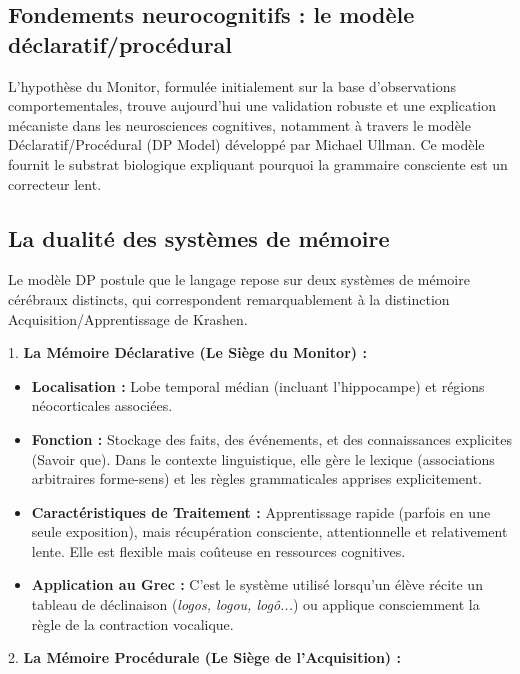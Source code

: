 \subsection{Fondements neurocognitifs : le modèle déclaratif/procédural}

L'hypothèse du Monitor, formulée initialement sur la base d'observations comportementales, trouve
aujourd'hui une validation robuste et une explication mécaniste dans les neurosciences cognitives,
notamment à travers le modèle Déclaratif/Procédural (DP Model) développé par Michael Ullman. Ce
modèle fournit le substrat biologique expliquant pourquoi la grammaire consciente est un correcteur
lent.\cite{II-2-3-ref13}



\subsection{La dualité des systèmes de mémoire}

Le modèle DP postule que le langage repose sur deux systèmes de mémoire cérébraux distincts, qui
correspondent remarquablement à la distinction Acquisition/Apprentissage de
Krashen.\cite{II-2-3-ref15}

1. \textbf{La Mémoire Déclarative (Le Siège du Monitor) :}

\begin{itemize}\item \textbf{Localisation :} Lobe temporal médian (incluant l'hippocampe) et régions néocorticales associées.\item \textbf{Fonction :} Stockage des faits, des événements, et des connaissances explicites (\og Savoir que\fg{}). Dans le contexte linguistique, elle gère le lexique (associations arbitraires forme-sens) et les règles grammaticales apprises explicitement.\item \textbf{Caractéristiques de Traitement :} Apprentissage rapide (parfois en une seule exposition), mais récupération consciente, attentionnelle et relativement lente. Elle est flexible mais coûteuse en ressources cognitives.\item \textbf{Application au Grec :} C'est le système utilisé lorsqu'un élève récite un tableau de déclinaison (\textit{logos, logou, logô...}) ou applique consciemment la règle de la contraction vocalique.\end{itemize}2. \textbf{La Mémoire Procédurale (Le Siège de l'Acquisition) :}

